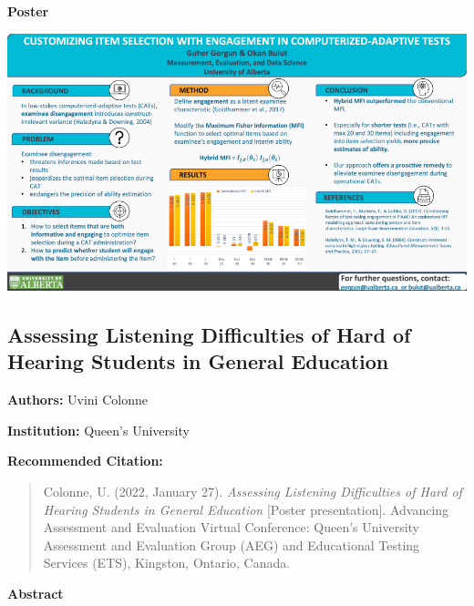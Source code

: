 \documentclass[
]{book}
\begin{document}
\textbf{Poster}

\includegraphics{Content/GO.png}

\newpage

\hypertarget{assessing-listening-difficulties-of-hard-of-hearing-students-in-general-education}{%
\subsection{Assessing Listening Difficulties of Hard of Hearing Students in General Education}\label{assessing-listening-difficulties-of-hard-of-hearing-students-in-general-education}}

\textbf{Authors:} Uvini Colonne

\textbf{Institution:} Queen's University

\textbf{Recommended Citation:}

\begin{quote}
Colonne, U. (2022, January 27). \emph{Assessing Listening Difficulties of Hard of Hearing Students in General Education} {[}Poster presentation{]}. Advancing Assessment and Evaluation Virtual Conference: Queen's University Assessment and Evaluation Group (AEG) and Educational Testing Services (ETS), Kingston, Ontario, Canada.
\end{quote}

\textbf{Abstract}
\end{document}
